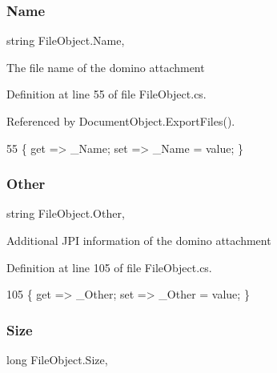 \subsubsection{\texorpdfstring{Name}{Name}}
{\footnotesize\ttfamily string File\+Object.\+Name\hspace{0.3cm}{\ttfamily [get]}, {\ttfamily [set]}}



The file name of the domino attachment 



Definition at line 55 of file File\+Object.\+cs.



Referenced by Document\+Object.\+Export\+Files().


\begin{DoxyCode}
55 \{ \textcolor{keyword}{get} => \_Name; \textcolor{keyword}{set} => \_Name = value; \}
\end{DoxyCode}
\mbox{\label{class_file_object_ab91b5eca56a04784f8d0187247e1280c}} 
\subsubsection{\texorpdfstring{Other}{Other}}
{\footnotesize\ttfamily string File\+Object.\+Other\hspace{0.3cm}{\ttfamily [get]}, {\ttfamily [set]}}



Additional J\+PI information of the domino attachment 



Definition at line 105 of file File\+Object.\+cs.


\begin{DoxyCode}
105 \{ \textcolor{keyword}{get} => \_Other; \textcolor{keyword}{set} => \_Other = value; \}
\end{DoxyCode}
\mbox{\label{class_file_object_a7aa7737c1ce05f4424ba16dded444949}} 
\subsubsection{\texorpdfstring{Size}{Size}}
{\footnotesize\ttfamily long File\+Object.\+Size\hspace{0.3cm}{\ttfamily [get]}, {\ttfamily [set]}}



